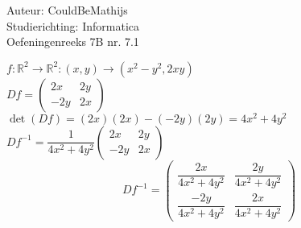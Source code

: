 \documentclass[a4paper]{article}
\newcommand{\setr}{\mathbb{R}}
\begin{document}
  
\noindent \large Auteur: CouldBeMathijs \\
\noindent \large Studierichting: Informatica\\
\noindent \large Oefeningenreeks 7B nr. 7.1\\

\medskip

\normalsize

$f: \setr^2 \rightarrow \setr^2 : (x,y) \rightarrow (x^2-y^2,2xy)$\\

$Df = \left(\begin{array}{cc}
	2x & 2y\\
	-2y & 2x
\end{array}\right)$\\
	
$\det(Df) = (2x)(2x)-(-2y)(2y) = 4x^2 + 4y^2$\\

$Df^{-1} = \dfrac{1}{4x^2+4y^2} \left(\begin{array}{cc}
	2x & 2y\\
	-2y & 2x
\end{array}\right)$\\

$$Df^{-1} = \left(\begin{array}{cc}
	\dfrac{2x}{4x^2+4y^2} & \dfrac{2y}{4x^2+4y^2}\\
	\dfrac{-2y}{4x^2+4y^2} & \dfrac{2x}{4x^2+4y^2}
\end{array}\right)$$

\begin{thebibliography}{999}
\end{thebibliography}
\end{document}

